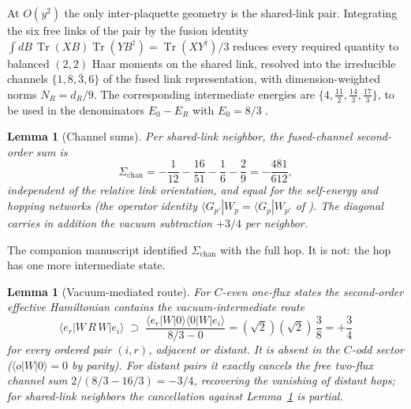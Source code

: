 \documentclass[11pt]{article}
\newtheorem{lemma}[theorem]{Lemma}
\newcommand{\Tr}{\operatorname{Tr}}
\newcommand{\ket}[1]{|#1\rangle}
\newcommand{\bra}[1]{\langle #1|}
\begin{document}
At $O(y^2)$ the only inter-plaquette geometry is the shared-link pair.
Integrating the six free links of the pair by the fusion identity
$\int dB\,\Tr(XB)\Tr(YB^\dagger)=\Tr(XY^\dagger)/3$ reduces every required
quantity to balanced $(2,2)$ Haar moments on the shared link, resolved into
the irreducible channels $\{1,8,\bar3,6\}$ of the fused link representation,
with dimension-weighted norms $N_R=d_R/9$. The corresponding intermediate
energies are $\{4,\tfrac{11}{2},\tfrac{14}{3},\tfrac{17}{3}\}$, to be used
in the denominators $E_0-E_R$ with $E_0=8/3$ \cite{companion}.

\begin{lemma}[Channel sums]\label{lem:channels}
Per shared-link neighbor, the fused-channel second-order sum is
\begin{equation}
\Sigma_{\mathrm{chan}}
=-\frac{1}{12}-\frac{16}{51}-\frac16-\frac29=-\frac{481}{612},
\end{equation}
independent of the relative link orientation, and equal for the self-energy
and hopping networks (the operator identity
$\bra{G_{p'}}W_p=\bra{G_p}W_{p'}$ of \cite{companion}). The diagonal carries
in addition the vacuum subtraction $+3/4$ per neighbor.
\end{lemma}

The companion manuscript identified $\Sigma_{\mathrm{chan}}$ with the full
hop. It is not: the hop has one more intermediate state.

\begin{lemma}[Vacuum-mediated route]\label{lem:vacroute}
For $C$-even one-flux states the second-order effective Hamiltonian contains
the vacuum-intermediate route
\begin{equation}
\bra{e_r}W\,R\,W\ket{e_i}\;\supset\;
\frac{\bra{e_r}W\ket{0}\bra{0}W\ket{e_i}}{8/3-0}
=(\sqrt2)(\sqrt2)\,\frac38=+\frac34
\end{equation}
for \emph{every} ordered pair $(i,r)$, adjacent or distant. It is absent in
the $C$-odd sector ($\bra{o}W\ket{0}=0$ by parity). For distant pairs it
exactly cancels the free two-flux channel sum $2/(8/3-16/3)=-3/4$,
recovering the vanishing of distant hops; for shared-link neighbors the
cancellation against Lemma~\ref{lem:channels} is partial.
\end{lemma}
\end{document}
